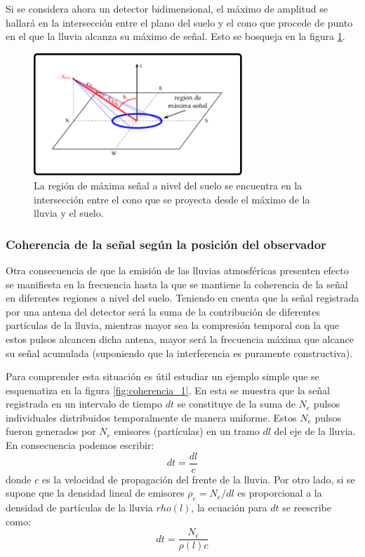 	Si se considera ahora un detector bidimensional, el m\'aximo de amplitud se hallar\'a en la intersecci\'on entre el plano del suelo y el cono \cher{} que procede de punto en el que la lluvia alcanza su m\'aximo de se\~nal. Esto se bosqueja en la figura \ref{fig:cono}.
	\begin{figure}[ht!]
		\centering
		\includegraphics[width=0.7\textwidth]{fig/EASRadio/chConeSch}
		\caption{\label{fig:cono} La región de máxima señal a nivel del suelo se encuentra en la intersección entre el cono \cher{} que se proyecta desde el máximo de la lluvia y el suelo.}
	\end{figure}
	
	
	\subsubsection{Coherencia de la se\~nal seg\'un la posici\'on del observador}
	
	Otra consecuencia de que la emisi\'on de las lluvias atmosf\'ericas presenten efecto \cher{} se manifiesta en la frecuencia hasta la que se mantiene la coherencia de la se\~nal en diferentes regiones a nivel del suelo.
	Teniendo en cuenta que la se\~nal registrada por una antena del detector ser\'a la suma de la contribuci\'on de diferentes part\'iculas de la lluvia, mientras mayor sea la compresi\'on temporal con la que estos pulsos alcancen dicha antena, mayor ser\'a la frecuencia m\'axima que alcance su se\~nal acumulada (suponiendo que la interferencia es puramente constructiva).
	
	Para comprender esta situaci\'on es \'util estudiar un ejemplo simple que se esquematiza en la figura \ref{fig:coherencia_1}.
	En esta se muestra que la se\~nal registrada en un intervalo de tiempo $dt$ se constituye de la suma de $N_e$ pulsos individuales distribuidos temporalmente de manera uniforme. Estos $N_e$ pulsos fueron generados por $N_e$ emisores (part\'iculas) en un tramo $dl$ del eje de la lluvia.
	En consecuencia podemos escribir:
	\begin{equation}
	dt = \frac{dl}{c}
	\end{equation}
	donde $c$ es la velocidad de propagaci\'on del frente de la lluvia.
	Por otro lado, si se supone que la densidad lineal de emisores $\rho_e = N_e/dl$ es proporcional a la densidad de part\'iculas de la lluvia $rho(l)$, la ecuaci\'on para $dt$ se reescribe como:
	\begin{equation}
	 dt = \frac{N_e}{\rho(l) c}
	\end{equation}
	
